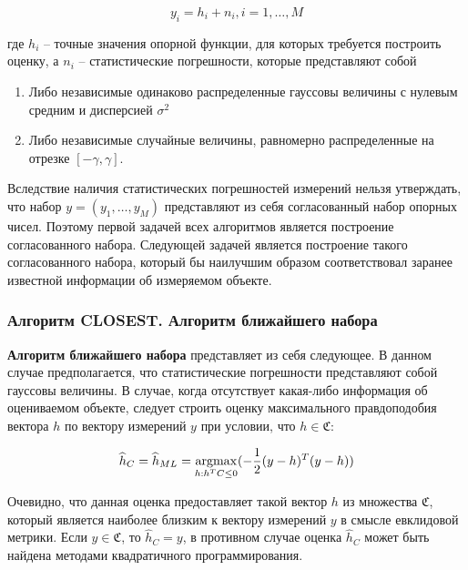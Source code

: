 \documentclass[a4paper, 12pt, titlepage]{article}
\theoremstyle{definition}
\theoremstyle{plain}
\theoremstyle{plain}
\begin{document}
\begin{equation}
y_{i} = h_{i} + n_{i}, i = 1, \ldots, M
\end{equation}

где $h_{i}$ -- точные значения опорной функции, для которых требуется построить
оценку, а $n_{i}$ -- статистические погрешности, которые представляют собой

\begin{enumerate}
 \item Либо независимые одинаково распределенные гауссовы величины с нулевым
 средним и дисперсией $\sigma^{2}$
 \item Либо независимые случайные величины, равномерно распределенные на отрезке
 $[ - \gamma, \gamma]$.
\end{enumerate}

Вследствие наличия статистических погрешностей измерений нельзя утверждать, что
набор $y = (y_{1}, \ldots, y_{M})$ представляют из себя согласованный набор
опорных чисел. Поэтому первой задачей всех алгоритмов является построение
согласованного набора. Следующей задачей является построение такого
согласованного набора, который бы наилучшим образом соответствовал заранее
известной информации об измеряемом объекте.

\subsubsection{Алгоритм CLOSEST. Алгоритм ближайшего набора}
\label{sec:support-methods:2d-uniform:closest}

\textbf{Алгоритм ближайшего набора} представляет из себя следующее. В данном
случае предполагается, что статистические погрешности представляют собой
гауссовы величины. В случае, когда отсутствует какая-либо информация об
оцениваемом объекте, следует строить оценку максимального правдоподобия вектора
$h$ по вектору измерений $y$ при условии, что $h \in \mathfrak{C}$:

\begin{equation}
\widehat{h}_{C} = \widehat{h}_{ML} =
\operatornamewithlimits{argmax}_{h: h^{T} C \leq 0}
( - \frac{1}{2} (y - h)^{T} (y - h))
\end{equation}

Очевидно, что данная оценка предоставляет такой вектор $h$ из множества
$\mathfrak{C}$, который является наиболее близким к вектору измерений $y$ в
смысле евклидовой метрики. Если $y \in \mathfrak{C}$, то $\widehat{h}_{C} = y$,
в противном случае оценка $\widehat{h}_{C}$ может быть найдена методами
квадратичного программирования.
\end{document}
